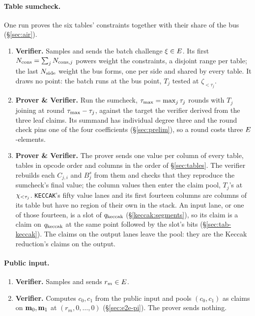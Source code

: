 \paragraph{Table sumcheck.} One run proves the six tables' constraints together with their share of the bus (\S\ref{sec:air}).
\begin{enumerate}
\item \textbf{Verifier.} Samples and sends the batch challenge $\xi\in E$. Its first $N_{\mathrm{cons}}=\sum_jN_{\mathrm{cons},j}$ powers weight the constraints, a disjoint range per table; the last $N_{\mathrm{side}}$ weight the bus forms, one per side and shared by every table. It draws no point: the batch runs at the bus point, $T_j$ tested at $\zeta_{<\tau_j}$.
\item \textbf{Prover \& Verifier.} Run the sumcheck, $\tau_{\max}=\max_j\tau_j$ rounds with $T_j$ joining at round $\tau_{\max}-\tau_j$, against the target the verifier derived from the three leaf claims. Its summand has individual degree three and the round check pins one of the four coefficients (\S\ref{sec:prelim}), so a round costs three $E$-elements.
\item \textbf{Prover \& Verifier.} The prover sends one value per column of every table, tables in opcode order and columns in the order of \S\ref{sec:tables}. The verifier rebuilds each $C_{j,i}$ and $B^{s}_j$ from them and checks that they reproduce the sumcheck's final value; the column values then enter the claim pool, $T_j$'s at $\chi_{<\tau_j}$. \texttt{KECCAK}'s fifty value lanes and its first fourteen columns are columns of its table but have no region of their own in the stack. An input lane, or one of those fourteen, is a slot of $q_{\mathrm{keccak}}$ (\S\ref{keccak:segments}), so its claim is a claim on $q_{\mathrm{keccak}}$ at the same point followed by the slot's bits (\S\ref{sec:tab-keccak}). The claims on the output lanes leave the pool: they are the Keccak reduction's claims on the output.
\end{enumerate}

\paragraph{Public input.}

\begin{enumerate}
\item \textbf{Verifier.} Samples and sends $r_m\in E$.
\item \textbf{Verifier.} Computes $c_0,c_1$ from the public input and pools $(c_0,c_1)$ as claims on $\mathbf{m}_0,\mathbf{m}_1$ at $(r_m,0,\dots,0)$ (\S\ref{sec:e2e-pi}). The prover sends nothing.
\end{enumerate}

